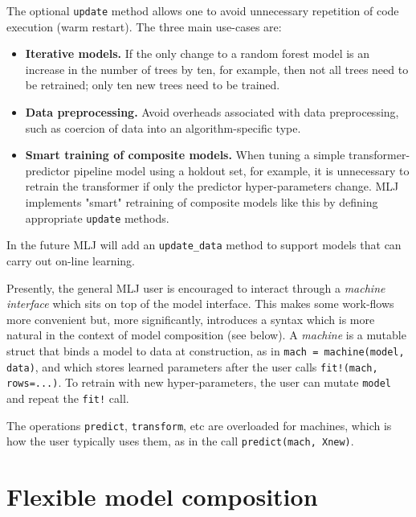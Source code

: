 \documentclass{article}
\begin{document}
The optional \texttt{update} method allows one to avoid unnecessary
repetition of code execution (warm restart). The three main use-cases
are:

\begin{itemize}

\item \textbf{Iterative models.} If the only change to a random forest
  model is an increase in the number of trees by ten, for example,
  then not all trees need to be retrained; only ten new trees need to
  be trained.

\item \textbf{Data preprocessing.} Avoid overheads associated with
  data preprocessing, such as coercion of data into an
  algorithm-specific type.

\item \textbf{Smart training of composite models.} When tuning a
  simple transformer-predictor pipeline model using a holdout set, for
  example, it is unnecessary to retrain the transformer if only the
  predictor hyper-parameters change. MLJ implements "smart" retraining
  of composite models like this by defining appropriate
  \texttt{update} methods.

\end{itemize}

In the future MLJ will add an \texttt{update\_data} method to support
models that can carry out on-line learning.

Presently, the general MLJ user is encouraged to interact through a
\textit{machine interface} which sits on top of the model
interface. This makes some work-flows more convenient but, more
significantly, introduces a syntax which is more natural in the
context of model composition (see below). A \textit{machine} is a
mutable struct that binds a model to data at construction, as in
\texttt{mach = machine(model, data)}, and which stores learned
parameters after the user calls \texttt{fit!(mach, rows=...)}. To
retrain with new hyper-parameters, the user can mutate \texttt{model}
and repeat the \texttt{fit!} call.

The operations \texttt{predict}, \texttt{transform}, etc are
overloaded for machines, which is how the user typically uses them, as
in the call \texttt{predict(mach, Xnew)}.

\section{Flexible model composition}
\end{document}
